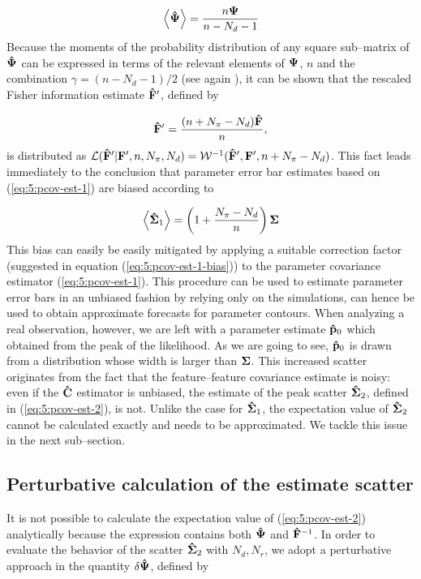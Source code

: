 \begin{equation}
\label{eq:5:inv-bias}
\left\langle\mathbf{\hat{\Psi}}\right\rangle = \frac{n\mathbf{\Psi}}{n-N_d-1}
\end{equation} 
%
Because the moments of the probability distribution of any square sub--matrix of $\mathbf{\hat{\Psi}}$ can be expressed in terms of the relevant elements of $\mathbf{\Psi}$, $n$ and the combination $\gamma=(n-N_d-1)/2$ (see again \citep{MasumotoWishart}), it can be shown that the rescaled Fisher information estimate $\mathbf{\hat{F}}'$, defined by 

\begin{equation}
\label{eq:5:rescaledF}
\mathbf{\hat{F}}' = \frac{(n+N_\pi-N_d)\mathbf{\hat{F}}}{n},
\end{equation}
%
is distributed as $\mathcal{L}(\mathbf{\hat{F}}'\vert\mathbf{F}',n,N_\pi,N_d) = \mathcal{W}^{-1}(\mathbf{\hat{F}}',\mathbf{F}',n+N_\pi-N_d)$. This fact leads immediately to the conclusion that parameter error bar estimates based on (\ref{eq:5:pcov-est-1}) are biased according to 

\begin{equation}
\label{eq:5:pcov-est-1-bias}
\left\langle\mathbf{\hat{\Sigma}}_1\right\rangle = \left(1+\frac{N_\pi-N_d}{n}\right)\mathbf{\Sigma}
\end{equation}
%
This bias can easily be easily mitigated by applying a suitable correction factor (suggested in equation (\ref{eq:5:pcov-est-1-bias})) to the parameter covariance estimator (\ref{eq:5:pcov-est-1}). This procedure can be used to estimate parameter error bars in an unbiased fashion by relying only on the simulations, can hence be used to obtain approximate forecasts for parameter contours. When analyzing a real observation, however, we are left with a parameter estimate $\mathbf{\hat{p}}_0$ which obtained from the peak of the likelihood. As we are going to see, $\mathbf{\hat{p}}_0$ is drawn from a distribution whose width is larger than $\mathbf{\Sigma}$. This increased scatter originates from the fact that the feature--feature covariance estimate is noisy: even if the $\mathbf{\hat{C}}$ estimator is unbiased, the estimate of the peak scatter $\mathbf{\hat{\Sigma}}_2$, defined in (\ref{eq:5:pcov-est-2}), is not. Unlike the case for $\mathbf{\hat{\Sigma}}_1$, the expectation value of $\mathbf{\hat{\Sigma}}_2$ cannot be calculated exactly and needs to be approximated. We tackle this issue in the next sub--section.  

\subsection{Perturbative calculation of the estimate scatter}
It is not possible to calculate the expectation value of (\ref{eq:5:pcov-est-2}) analytically because the expression contains both $\mathbf{\hat{\Psi}}$ and $\mathbf{\hat{F}}^{-1}$. In order to evaluate the behavior of the scatter $\mathbf{\hat{\Sigma}}_2$ with $N_d,N_r$, we adopt a perturbative approach in the quantity $\delta\mathbf{\hat{\Psi}}$, defined by

